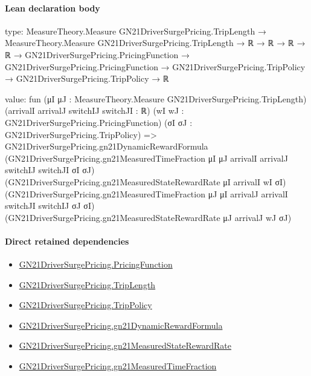 \documentclass[10pt]{article}
\begin{document}
\paragraph{Lean declaration body}
\begin{ReviewVerbatim}
type:
MeasureTheory.Measure GN21DriverSurgePricing.TripLength →
  MeasureTheory.Measure GN21DriverSurgePricing.TripLength →
    ℝ →
      ℝ →
        ℝ →
          ℝ →
            GN21DriverSurgePricing.PricingFunction →
              GN21DriverSurgePricing.PricingFunction →
                GN21DriverSurgePricing.TripPolicy → GN21DriverSurgePricing.TripPolicy → ℝ

value:
fun (μI μJ : MeasureTheory.Measure GN21DriverSurgePricing.TripLength) (arrivalI arrivalJ switchIJ switchJI : ℝ)
    (wI wJ : GN21DriverSurgePricing.PricingFunction) (σI σJ : GN21DriverSurgePricing.TripPolicy) =>
  GN21DriverSurgePricing.gn21DynamicRewardFormula
    (GN21DriverSurgePricing.gn21MeasuredTimeFraction μI μJ arrivalI arrivalJ switchIJ switchJI σI σJ)
    (GN21DriverSurgePricing.gn21MeasuredStateRewardRate μI arrivalI wI σI)
    (GN21DriverSurgePricing.gn21MeasuredTimeFraction μJ μI arrivalJ arrivalI switchJI switchIJ σJ σI)
    (GN21DriverSurgePricing.gn21MeasuredStateRewardRate μJ arrivalJ wJ σJ)
\end{ReviewVerbatim}

\paragraph{Direct retained dependencies}
\begin{itemize}\raggedright
\item \hyperlink{governing-declaration-9ab0ab344da5df05}{GN21\allowbreak{}Driver\allowbreak{}Surge\allowbreak{}Pricing.\allowbreak{}Pricing\allowbreak{}Function}
\item \hyperlink{governing-declaration-a616c143f22cf2bc}{GN21\allowbreak{}Driver\allowbreak{}Surge\allowbreak{}Pricing.\allowbreak{}Trip\allowbreak{}Length}
\item \hyperlink{governing-declaration-4312ad4cb899871f}{GN21\allowbreak{}Driver\allowbreak{}Surge\allowbreak{}Pricing.\allowbreak{}Trip\allowbreak{}Policy}
\item \hyperlink{governing-declaration-a0d3bb3e3bf8e7f3}{GN21\allowbreak{}Driver\allowbreak{}Surge\allowbreak{}Pricing.\allowbreak{}gn21\allowbreak{}Dynamic\allowbreak{}Reward\allowbreak{}Formula}
\item \hyperlink{governing-declaration-bafe7c69655a9faa}{GN21\allowbreak{}Driver\allowbreak{}Surge\allowbreak{}Pricing.\allowbreak{}gn21\allowbreak{}Measured\allowbreak{}State\allowbreak{}Reward\allowbreak{}Rate}
\item \hyperlink{governing-declaration-b546250b44884c6e}{GN21\allowbreak{}Driver\allowbreak{}Surge\allowbreak{}Pricing.\allowbreak{}gn21\allowbreak{}Measured\allowbreak{}Time\allowbreak{}Fraction}
\end{itemize}
\hypertarget{governing-declaration-4219a4705aa43999}{}
\end{document}
